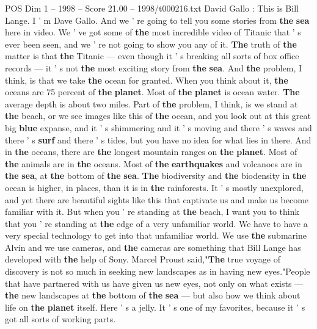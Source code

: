 \begin{textsample}{POS Dim 1 – 1998 – Score 21.00 – 1998/t000216.txt}  \label{ex:f1_pos_014}
David Gallo : This is Bill Lange.
I ' m Dave Gallo.
And we ' re going to tell you some stories from \textbf{the} \textbf{sea} here in video.
We ' ve got some of \textbf{the} most incredible video of Titanic that ' s ever been seen, and we ' re not going to show you any of it. \textbf{The} truth of \textbf{the} matter is that \textbf{the} Titanic — even though it ' s breaking all sorts of box office records — it ' s not \textbf{the} most exciting story from \textbf{the} \textbf{sea}.
And \textbf{the} problem, I think, is that we take \textbf{the} ocean for granted.
When you think about it, \textbf{the} oceans are 75 percent of \textbf{the} \textbf{planet}.
Most of \textbf{the} \textbf{planet} is ocean water. \textbf{The} average depth is about two miles.
Part of \textbf{the} problem, I think, is we stand at \textbf{the} beach, or we see images like this of \textbf{the} ocean, and you look out at this great big \textbf{blue} expanse, and it ' s shimmering and it ' s moving and there ' s waves and there ' s \textbf{surf} and there ' s tides, but you have no idea for what lies in there.
And in \textbf{the} oceans, there are \textbf{the} longest mountain ranges on \textbf{the} \textbf{planet}.
Most of \textbf{the} animals are in \textbf{the} oceans.
Most of \textbf{the} \textbf{earthquakes} and volcanoes are in \textbf{the} \textbf{sea}, at \textbf{the} bottom of \textbf{the} \textbf{sea}. \textbf{The} biodiversity and \textbf{the} biodensity in \textbf{the} ocean is higher, in places, than it is in \textbf{the} rainforests.
It ' s mostly unexplored, and yet there are beautiful sights like this that captivate us and make us become familiar with it.
But when you ' re standing at \textbf{the} beach, I want you to think that you ' re standing at \textbf{the} edge of a very unfamiliar world.
We have to have a very special technology to get into that unfamiliar world.
We use \textbf{the} submarine Alvin and we use cameras, and \textbf{the} cameras are something that Bill Lange has developed with \textbf{the} help of Sony.
Marcel Proust said,"\textbf{The} true voyage of discovery is not so much in seeking new landscapes as in having new eyes."People that have partnered with us have given us new eyes, not only on what exists — \textbf{the} new landscapes at \textbf{the} bottom of \textbf{the} \textbf{sea} — but also how we think about life on \textbf{the} \textbf{planet} itself.
Here ' s a jelly.
It ' s one of my favorites, because it ' s got all sorts of working parts.

\end{textsample}
